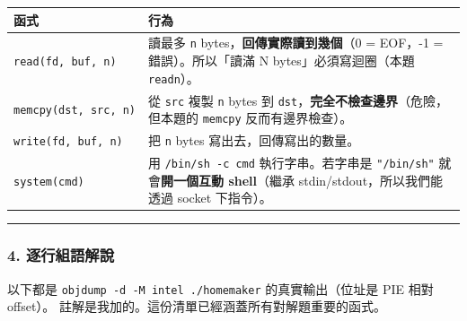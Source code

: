 \documentclass[10pt,a4paper]{article}
\newcounter{none}
\renewenvironment{quote}{%
  \begin{mdframed}[linewidth=0pt,innerleftmargin=0pt,innerrightmargin=0pt,
    innerbottommargin=0pt,innertopmargin=0pt,skipabove=0.55em,skipbelow=0.55em,
    leftmargin=0.9em,rightmargin=0.4em,startcode={\color{quotebar}\vrule width 2.6pt},%
    endcode={}]%
  \itshape\color{black}%
}{%
  \end{mdframed}%
}
\begin{document}
{\def\LTcaptype{none} %
\begin{longtable}[]{@{}
  >{\raggedright\arraybackslash}p{}
  >{\raggedright\arraybackslash}p{}@{}}
\toprule\noalign{}
\begin{minipage}[b]{\linewidth}\raggedright
函式
\end{minipage} & \begin{minipage}[b]{\linewidth}\raggedright
行為
\end{minipage} \\
\midrule\noalign{}
\endhead
\bottomrule\noalign{}
\endlastfoot
\texttt{read(fd,\allowbreak{}\ \allowbreak{}buf,\allowbreak{}\ \allowbreak{}n)} & 讀最多 \texttt{n}
bytes，\textbf{回傳實際讀到幾個}（0 = EOF，-1 = 錯誤）。所以「讀滿 N
bytes」必須寫迴圈（本題 \texttt{readn}）。 \\
\texttt{memcpy(dst,\allowbreak{}\ \allowbreak{}src,\allowbreak{}\ \allowbreak{}n)} & 從 \texttt{src} 複製 \texttt{n} bytes
到 \texttt{dst}，\textbf{完全不檢查邊界}（危險，但本題的 \texttt{memcpy}
反而有邊界檢查）。 \\
\texttt{write(fd,\allowbreak{}\ \allowbreak{}buf,\allowbreak{}\ \allowbreak{}n)} & 把 \texttt{n} bytes
寫出去，回傳寫出的數量。 \\
\texttt{system(cmd)} & 用 \texttt{/\allowbreak{}bin/\allowbreak{}sh\ \allowbreak{}-\allowbreak{}c\ \allowbreak{}cmd} 執行字串。若字串是
\texttt{"/\allowbreak{}bin/\allowbreak{}sh"} 就會\textbf{開一個互動 shell}（繼承
stdin/stdout，所以我們能透過 socket 下指令）。 \\
\end{longtable}
}

\begin{center}\rule{0.5\linewidth}{0.5pt}\end{center}

\subsubsection{4.
逐行組語解說}\label{ux9010ux884cux7d44ux8a9eux89e3ux8aaa-1}

\begin{quote}
以下都是 \texttt{objdump\ \allowbreak{}-\allowbreak{}d\ \allowbreak{}-\allowbreak{}M\ \allowbreak{}intel\ \allowbreak{}./\allowbreak{}homemaker} 的真實輸出（位址是
PIE 相對 offset）。 註解是我加的。這份清單已經涵蓋所有對解題重要的函式。
\end{quote}
\end{document}
